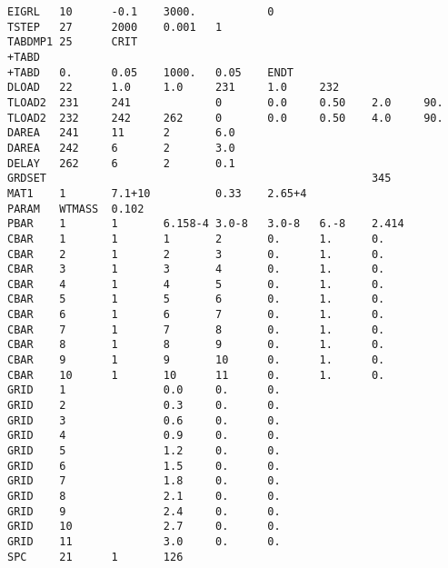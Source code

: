 \begin{lstlisting}[caption={NASTRAN input file for Cantilever Beam},label={lst:cbeam}]
EIGRL   10      -0.1    3000.           0
TSTEP   27      2000    0.001   1
TABDMP1 25      CRIT                                                    +TABD
+TABD   0.      0.05    1000.   0.05    ENDT
DLOAD   22      1.0     1.0     231     1.0     232
TLOAD2  231     241             0       0.0     0.50    2.0     90.
TLOAD2  232     242     262     0       0.0     0.50    4.0     90.
DAREA   241     11      2       6.0
DAREA   242     6       2       3.0
DELAY   262     6       2       0.1
GRDSET                                                  345
MAT1    1       7.1+10          0.33    2.65+4
PARAM   WTMASS  0.102
PBAR    1       1       6.158-4 3.0-8   3.0-8   6.-8    2.414
CBAR    1       1       1       2       0.      1.      0.                      
CBAR    2       1       2       3       0.      1.      0.                      
CBAR    3       1       3       4       0.      1.      0.                      
CBAR    4       1       4       5       0.      1.      0.                      
CBAR    5       1       5       6       0.      1.      0.                      
CBAR    6       1       6       7       0.      1.      0.                      
CBAR    7       1       7       8       0.      1.      0.                      
CBAR    8       1       8       9       0.      1.      0.                      
CBAR    9       1       9       10      0.      1.      0.                      
CBAR    10      1       10      11      0.      1.      0.                      
GRID    1               0.0     0.      0.                                      
GRID    2               0.3     0.      0.                                      
GRID    3               0.6     0.      0.                                      
GRID    4               0.9     0.      0.                                      
GRID    5               1.2     0.      0.                                      
GRID    6               1.5     0.      0.                                      
GRID    7               1.8     0.      0.                                      
GRID    8               2.1     0.      0.                                      
GRID    9               2.4     0.      0.                                      
GRID    10              2.7     0.      0.                                      
GRID    11              3.0     0.      0.                                      
SPC     21      1       126
\end{lstlisting}

